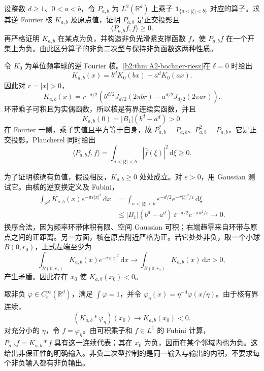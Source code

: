 \begin{exercise}\label{b2:ex:A2-shell-kernel}
设整数 \(d\geq1\)、\(0<a<b\)，令 \(P_{a,b}\) 为
\(L^2(\mathbb R^d)\) 上乘子
\(\mathbf1_{\{a<|\xi|<b\}}\) 对应的算子。求其逆 Fourier 核
\(K_{a,b}\) 及原点值，证明 \(P_{a,b}\) 是正交投影且
\[
 \langle P_{a,b}f,f\rangle\geq0.
\]
再严格证明 \(K_{a,b}\) 在某点为负，并构造非负光滑紧支撑函数 \(f\)，使 \(P_{a,b}f\) 在一个开集上为负。由此区分算子的非负二次型与保持非负函数这两种性质。
\end{exercise}
\begin{solution}
令 \(K_0\) 为单位频率球的逆 Fourier 核。\cref{b2:thm:A2-bochner-riesz}在 \(\delta=0\) 时给出
\[
 K_{a,b}(x)=b^dK_0(bx)-a^dK_0(ax).
\]
因此对 \(r=|x|>0\)，
\[
 K_{a,b}(x)
 =r^{-d/2}
       \left(b^{d/2}J_{d/2}(2\pi br)
             -a^{d/2}J_{d/2}(2\pi ar)\right).
\]
环带乘子可积且为实偶函数，所以核是有界连续实函数，并且
\[
 K_{a,b}(0)=|B_1|(b^d-a^d)>0.
\]
在 Fourier 一侧，乘子实值且平方等于自身，故
\(P_{a,b}^*=P_{a,b}\)、\(P_{a,b}^2=P_{a,b}\)，它是正交投影。Plancherel 同时给出
\[
 \langle P_{a,b}f,f\rangle
 =\int_{a<|\xi|<b}|\widehat f(\xi)|^2\,\mathrm d\xi\geq0.
\]

为了证明核确有负值，假设相反，\(K_{a,b}\geq0\) 处处成立。对 \(\varepsilon>0\)，用 Gaussian 测试它。由核的逆变换定义及 Fubini，
\[
 \begin{aligned}
 \int_{\mathbb R^d}K_{a,b}(x)e^{-\pi\varepsilon|x|^2}\,\mathrm dx
 &=\int_{a<|\xi|<b}
       \varepsilon^{-d/2}e^{-\pi|\xi|^2/\varepsilon}\,\mathrm d\xi\\
 &\leq |B_1|(b^d-a^d)\,
       \varepsilon^{-d/2}e^{-\pi a^2/\varepsilon}
 \longrightarrow0.
 \end{aligned}
\]
换序合法，因为频率环带体积有限、空间 Gaussian 可积；右端趋零来自环带与原点之间的正距离。另一方面，核在原点附近严格为正。若它处处非负，取一个小球 \(B(0,r_0)\)，上式左端至少为
\[
 \int_{B(0,r_0)}K_{a,b}(x)e^{-\pi\varepsilon|x|^2}\,\mathrm dx
 \longrightarrow\int_{B(0,r_0)}K_{a,b}(x)\,\mathrm dx>0,
\]
产生矛盾。因此存在 \(x_0\) 使 \(K_{a,b}(x_0)<0\)。

取非负 \(\varphi\in C_c^\infty(\mathbb R^d)\)，满足 \(\int\varphi=1\)，并令
\(\varphi_\eta(x)=\eta^{-d}\varphi(x/\eta)\)。由于核有界连续，
\[
 (K_{a,b}*\varphi_\eta)(x_0)
       \longrightarrow K_{a,b}(x_0)<0.
\]
对充分小的 \(\eta\)，令 \(f=\varphi_\eta\)。由可积乘子和 \(f\in L^1\) 的 Fubini 计算，
\(P_{a,b}f=K_{a,b}*f\) 具有这一连续代表；其在 \(x_0\) 为负，因而在某个邻域内也为负。这给出非保正性的明确输入。非负二次型控制的是同一输入与输出的内积，不要求每个非负输入都有非负输出。
\end{solution}

